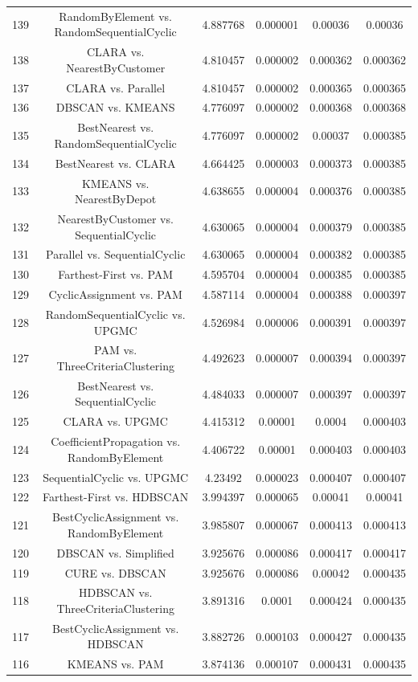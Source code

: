 \documentclass[a4paper,10pt]{article}
\begin{document}
\begin{landscape}
\begin{table}[!htp]
\begin{tabular}{cccccc}
139&RandomByElement vs. RandomSequentialCyclic&4.887768&0.000001&0.00036&0.00036\\
138&CLARA vs. NearestByCustomer&4.810457&0.000002&0.000362&0.000362\\
137&CLARA vs. Parallel&4.810457&0.000002&0.000365&0.000365\\
136&DBSCAN vs. KMEANS&4.776097&0.000002&0.000368&0.000368\\
135&BestNearest vs. RandomSequentialCyclic&4.776097&0.000002&0.00037&0.000385\\
134&BestNearest vs. CLARA&4.664425&0.000003&0.000373&0.000385\\
133&KMEANS vs. NearestByDepot&4.638655&0.000004&0.000376&0.000385\\
132&NearestByCustomer vs. SequentialCyclic&4.630065&0.000004&0.000379&0.000385\\
131&Parallel vs. SequentialCyclic&4.630065&0.000004&0.000382&0.000385\\
130&Farthest-First vs. PAM&4.595704&0.000004&0.000385&0.000385\\
129&CyclicAssignment vs. PAM&4.587114&0.000004&0.000388&0.000397\\
128&RandomSequentialCyclic vs. UPGMC&4.526984&0.000006&0.000391&0.000397\\
127&PAM vs. ThreeCriteriaClustering&4.492623&0.000007&0.000394&0.000397\\
126&BestNearest vs. SequentialCyclic&4.484033&0.000007&0.000397&0.000397\\
125&CLARA vs. UPGMC&4.415312&0.00001&0.0004&0.000403\\
124&CoefficientPropagation vs. RandomByElement&4.406722&0.00001&0.000403&0.000403\\
123&SequentialCyclic vs. UPGMC&4.23492&0.000023&0.000407&0.000407\\
122&Farthest-First vs. HDBSCAN&3.994397&0.000065&0.00041&0.00041\\
121&BestCyclicAssignment vs. RandomByElement&3.985807&0.000067&0.000413&0.000413\\
120&DBSCAN vs. Simplified&3.925676&0.000086&0.000417&0.000417\\
119&CURE vs. DBSCAN&3.925676&0.000086&0.00042&0.000435\\
118&HDBSCAN vs. ThreeCriteriaClustering&3.891316&0.0001&0.000424&0.000435\\
117&BestCyclicAssignment vs. HDBSCAN&3.882726&0.000103&0.000427&0.000435\\
116&KMEANS vs. PAM&3.874136&0.000107&0.000431&0.000435\\

\end{tabular}
\end{table}
\end{landscape}
\end{document}
